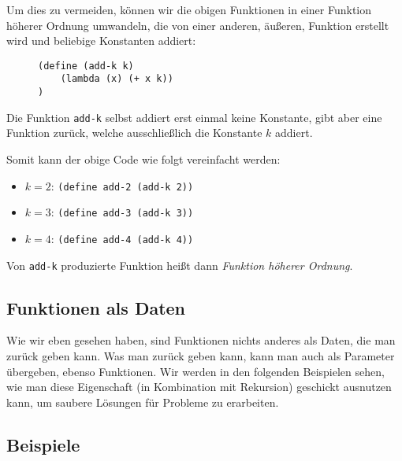 	Um dies zu vermeiden, können wir die obigen Funktionen in einer Funktion höherer Ordnung umwandeln, die von einer anderen, äußeren, Funktion erstellt wird und beliebige Konstanten addiert:
	\begin{figure}[H]
		\centering
		\begin{lstlisting}[language = Racket]
(define (add-k k)
	(lambda (x) (+ x k))
)
		\end{lstlisting}
	\end{figure}
	Die Funktion \texttt{add-k} selbst addiert erst einmal keine Konstante, gibt aber eine Funktion zurück, welche ausschließlich die Konstante \(k\) addiert.
	
	Somit kann der obige Code wie folgt vereinfacht werden:
	\begin{itemize}
		\item \( k = 2 \): \lstinline[language = Racket]|(define add-2 (add-k 2))|
		\item \( k = 3 \): \lstinline[language = Racket]|(define add-3 (add-k 3))|
		\item \( k = 4 \): \lstinline[language = Racket]|(define add-4 (add-k 4))|
	\end{itemize}
	Von \texttt{add-k} produzierte Funktion heißt dann \textit{Funktion höherer Ordnung}.
	

\subsection{Funktionen als Daten}
	Wie wir eben gesehen haben, sind Funktionen nichts anderes als Daten, die man zurück geben kann. Was man zurück geben kann, kann man auch als Parameter übergeben, ebenso Funktionen. Wir werden in den folgenden Beispielen sehen, wie man diese Eigenschaft (in Kombination mit Rekursion) geschickt ausnutzen kann, um saubere Lösungen für Probleme zu erarbeiten.

\subsection{Beispiele}
